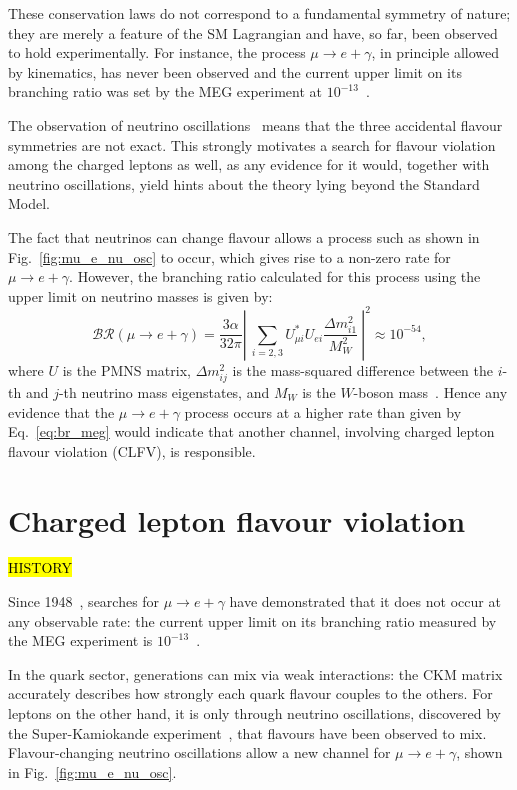 These conservation laws do not correspond to a fundamental symmetry of nature;
they are merely a feature of the SM Lagrangian and have, so far, been observed
to hold experimentally. For instance, the process ${\mu \rightarrow e +
\gamma}$, in principle allowed by kinematics, has never been observed and the
current upper limit on its branching ratio was set by the MEG experiment at
$10^{-13}$~\cite{mori2016final}.

The observation of neutrino oscillations~\cite{PhysRevLett.81.1562} means that
the three accidental flavour symmetries are not exact. This strongly
motivates a search for flavour violation among the charged leptons as well, as
any evidence for it would, together with neutrino oscillations, yield hints
about the theory lying beyond the Standard Model.

The fact that neutrinos can change flavour allows a process such as shown in
Fig.~\ref{fig:mu_e_nu_osc} to occur, which gives rise to a non-zero rate for
${\mu \rightarrow e + \gamma}$. However, the branching ratio calculated for this
process using the upper limit on neutrino masses is given by:
\begin{equation}\label{eq:br_meg}
\mathcal{BR}(\mu \rightarrow e + \gamma) = \frac{3\alpha}{32\pi} \left|\ \sum_{i=2, 3} U^*_{\mu i} U_{e i} 
\frac{\Delta m^2_{i1}}{M^2_W}  \ \right| ^2 \approx 10^{-54},
\end{equation}
where $U$ is the PMNS matrix, $\Delta m^2_{ij}$ is the mass-squared difference between the
$i$-th and $j$-th neutrino mass eigenstates, and $M_W$ is the $W$-boson
mass~\cite{BERNSTEIN201327}.
Hence any evidence that the ${\mu \rightarrow e + \gamma}$ process occurs at a higher
rate than given by Eq.~\ref{eq:br_meg} would indicate that another channel,
involving charged lepton flavour violation (CLFV), is responsible.

\section{Charged lepton flavour violation}
\hl{HISTORY}

Since 1948~\cite{PhysRev.73.257}, searches for ${\mu \rightarrow e + \gamma}$
have demonstrated that it does not occur at any observable rate: the current
upper limit on its branching ratio measured by the MEG experiment is
$10^{-13}$~\cite{mori2016final}.

In the quark sector, generations can mix via weak interactions: the
CKM matrix accurately describes how strongly each quark flavour couples
to the others. %
For leptons on the other hand, it is
only through neutrino oscillations, discovered by the Super-Kamiokande
experiment~\cite{PhysRevLett.81.1562}, that flavours have been observed to mix. 
Flavour-changing neutrino oscillations allow a new channel for ${\mu \rightarrow
e + \gamma}$, shown in Fig.~\ref{fig:mu_e_nu_osc}. 

